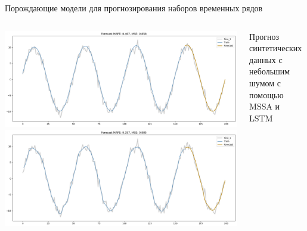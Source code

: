 \documentclass{beamer}
\begin{document}
\begin{frame}{Порождающие модели для прогнозирования наборов временных рядов}


\begin{columns}[c]

\begin{columns}[c]
\includegraphics[width=1\textwidth]{fig/sin_mssa_small_ampl.png}
\includegraphics[width=1\textwidth]{fig/sin_lstm_small_ampl.png}
\end{columns}
    Прогноз синтетических данных с небольшим шумом с помощью MSSA и LSTM


\end{columns}
\end{frame}
\end{document}
